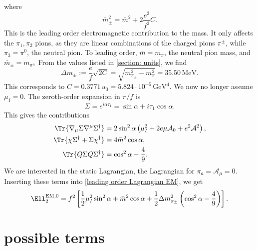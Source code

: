 \documentclass{book}
\begin{document}
%
where
\begin{equation}
    \bar m_\pm^2 = \bar m^2 + 2\frac{e^2}{f^2}C.
\end{equation}
%
This is the leading order electromagnetic contribution to the mass.
It only affects the $\pi_1, \pi_2$ pions, as they are linear combinations of the charged pions $\pi^\pm$, while $\pi_3 = \pi^0$, the neutral pion.
To leading order, $\bar m = m_\pi$, the neutral pion mass, and $\bar m_{\pm} = m_{\pi^{\pm}}$
From the values listed in \autoref{section: units}, we find
%
\begin{equation}
    \label{EM mass contribtuion leading order}
    \Delta m_{\pm} := \frac{e}{f}\sqrt{2C} = \sqrt{m_{\pi_\pm}^2 - m_{\pi}^2} = 35.50 \, \text{MeV}.
\end{equation}
%
This corresponds to $C = 0.3771 \, u_0 = 5.824 \cdot 10^{-5} \, \text{GeV}^4$.
We now no longer assume $\mu_I = 0$.
The zeroth-order expansion in $\pi/f$ is
%
\begin{equation}
    \Sigma = e^{i \alpha \tau_1} = \sin \alpha + i \tau_1 \cos \alpha.
\end{equation}
%
This gives the contributions
%
\begin{align}
    \Tr{\nabla_\mu \Sigma \nabla^\mu \Sigma^\dagger}
    & = 2 \sin^2\alpha\left(\mu_I^2 + 2 e \mu \mathcal A_0 + e^2\mathcal A^2 \right), \\
    \Tr{\chi \Sigma^\dagger + \Sigma \chi^\dagger}
    & =4 \bar m^2 \cos \alpha,\\
    \Tr{Q \Sigma Q \Sigma^\dagger}
    & =  \cos^2 \alpha - \frac{4}{9}.
\end{align}
%
We are interested in the static Lagrangian, the Lagrangian for $\pi_a = \mathcal A_\mu = 0$.
Inserting these terms into \autoref{leading order Lagrangian EM}, we get
%
\begin{equation}
    \label{static Lagrangian with EM}
    \Ell^{\text{EM}, 0}_2
    = f^2 \left[
        \frac{1}{2}\mu_I^2 \sin^2 \alpha + \bar m^2 \cos \alpha 
        + \frac{1}{2} \Delta m^2_{\pi_\pm} \left(\cos^2 \alpha - \frac{4}{9}\right)
    \right].
\end{equation}
%


\section{possible terms}
\end{document}
